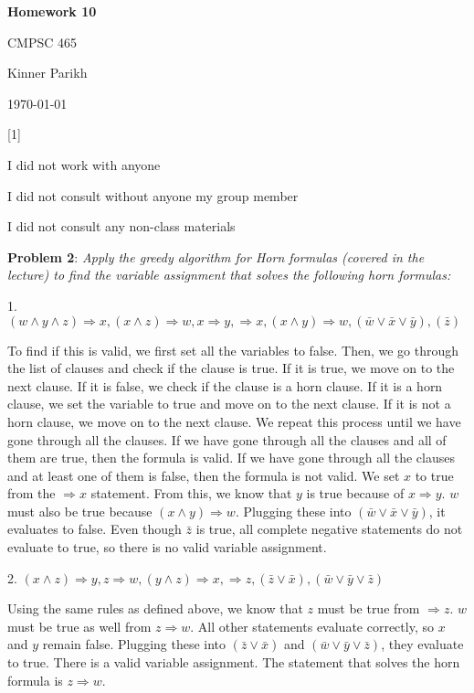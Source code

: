 \documentclass{article} %
\newcommand{\question}[2][]{\begin{flushleft}
        \textbf{Problem #1}: \textit{#2}

\end{flushleft}}
\newcommand{\maketitletwo}[2][]{\begin{center}
        \Large{\textbf{Homework #1}
            
            CMPSC 465} %
        \vspace{5pt}
        
        \normalsize{Kinner Parikh  %
        
        \today}        %
        \vspace{40pt}


        \newpage
        
\end{center}}
\begin{document}
    \maketitletwo[10]  %

    \question[1]{}
    \begin{center}
        
        I did not work with anyone
    
        I did not consult without anyone my group member
    
        I did not consult any non-class materials
    \end{center}
    
    \newpage

    \question[2]{Apply the greedy algorithm for Horn formulas (covered in the lecture) to find the variable assignment that solves the following horn formulas:}

    1. $(w \land  y \land z) \Rightarrow x, (x \land z) \Rightarrow w, x \Rightarrow y,\Rightarrow x, (x \land y) \Rightarrow w, (\bar{w} \lor \bar{x} \lor \bar{y}), (\bar{z})$

    To find if this is valid, we first set all the variables to false. Then, we go through the list of clauses and check if the clause is true. If it is true, we move on to the next clause. If it is false, we check if the clause is a horn clause. If it is a horn clause, we set the variable to true and move on to the next clause. If it is not a horn clause, we move on to the next clause. We repeat this process until we have gone through all the clauses. If we have gone through all the clauses and all of them are true, then the formula is valid. If we have gone through all the clauses and at least one of them is false, then the formula is not valid. We set $x$ to true from the $\Rightarrow x$ statement. From this, we know that $y$ is true because of $x \Rightarrow y$. $w$ must also be true because $(x \land y) \Rightarrow w$. Plugging these into $(\bar{w} \lor \bar{x} \lor \bar{y})$, it evaluates to false. Even though $\bar{z}$ is true, all complete negative statements do not evaluate to true, so there is no valid variable assignment.

    2. $(x \land z) \Rightarrow y, z \Rightarrow w, (y \land z) \Rightarrow x, \Rightarrow z, (\bar{z} \lor \bar{x}), (\bar{w} \lor \bar{y} \lor \bar{z})$
    
    Using the same rules as defined above, we know that $z$ must be true from $\Rightarrow z$. $w$ must be true as well from $z \Rightarrow w$. All other statements evaluate correctly, so $x$ and $y$ remain false. Plugging these into $(\bar{z} \lor \bar{x})$ and $(\bar{w} \lor \bar{y} \lor \bar{z})$, they evaluate to true. There is a valid variable assignment. The statement that solves the horn formula is $z \Rightarrow w$.
\end{document}
